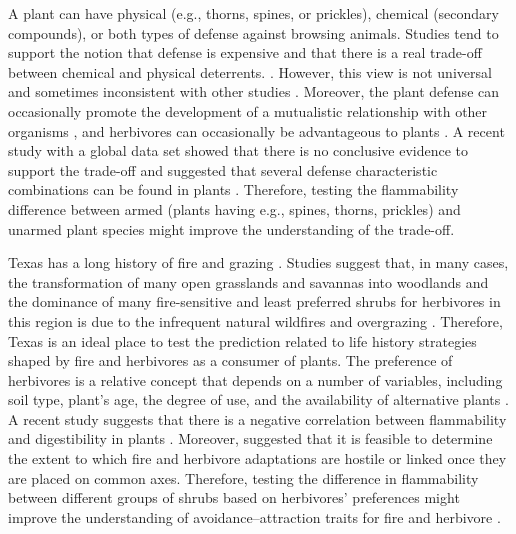 \documentclass[12pt]{report}
\begin{document}
A plant can have physical (e.g., thorns, spines, or prickles), chemical (secondary compounds), or both types of defense against browsing animals. Studies tend to support the notion that defense is expensive and that there is a real trade-off between chemical and physical deterrents. \citep{rhoades1979evolution, van1988defence,twigg1996physicalchemical}. However, this view is not universal and sometimes inconsistent with other studies \citep{iddles2003potentialnegativecorrelation,steward1988theredifferentview,koricheva2004metanegativecorrelation}. Moreover, the plant defense can occasionally promote the development of a mutualistic relationship with other organisms \citep{janzen1966coevolution}, and herbivores can occasionally be advantageous to plants \citep{belsky1986does}. A recent study with a global data set showed that there is no conclusive evidence to support the trade-off and suggested that several defense characteristic combinations can be found in plants \citep{moles2013correlations}. Therefore, testing the flammability difference between armed (plants having e.g., spines, thorns, prickles) and unarmed plant species might improve the understanding of the trade-off.

Texas has a long history of fire \citep{moir1982firehistory, stambaugh2011firehistory,stambaugh2014historicalfirehistory,smeins2005historyoffire1} and grazing \citep{buechner1950lifegrazing, wilcox2012historicalgrazing2}. Studies suggest that, in many cases, the transformation of many open grasslands and savannas into woodlands and the dominance of many fire-sensitive and least preferred shrubs for herbivores in this region is due to the infrequent natural wildfires and overgrazing \citep{archer1989havejoint,andruk2014joint, masters1986prescribed}. Therefore, Texas is an ideal place to test the prediction related to life history strategies shaped by fire and herbivores as a consumer of plants. The preference of herbivores is a relative concept that depends on a number of variables, including soil type, plant's age, the degree of use, and the availability of alternative plants \citep{wright2003white}.  A recent study suggests that there is a negative correlation between flammability and digestibility in plants \citep{gowda2022digestibility}. Moreover, \citep{archibald2019unified} suggested that it is feasible to determine the extent to which fire and herbivore adaptations are hostile or linked once they are placed on common axes. Therefore, testing the difference in flammability between different groups of shrubs based on herbivores' preferences might improve the understanding of avoidance–attraction traits for fire and herbivore \citep{schwilk2003flammability, archibald2019unified}. 
\end{document}

